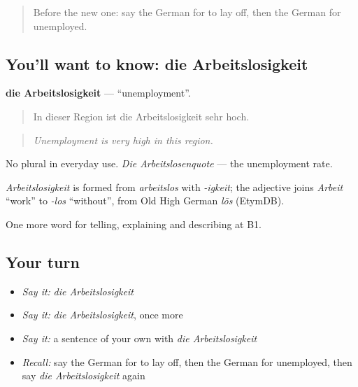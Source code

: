 \label{lesson:GE-C352-arbeitslosigkeit}



\begin{quote}
Before the new one: say the German for to lay off, then the German for unemployed.
\end{quote}

\subsection*{You'll want to know: die Arbeitslosigkeit}
\textbf{die Arbeitslosigkeit} — \textquotedblleft{}unemployment\textquotedblright{}.

\begin{quote}
In dieser Region ist die Arbeitslosigkeit sehr hoch.
\end{quote}

\begin{quote}
\emph{Unemployment is very high in this region.}
\end{quote}

No plural in everyday use. \emph{Die Arbeitslosenquote} — the unemployment rate.

\begin{cousinweb}
\emph{Arbeitslosigkeit} is formed from \emph{arbeitslos} with \emph{-igkeit}; the adjective joins \emph{Arbeit} \textquotedblleft{}work\textquotedblright{} to \emph{-los} \textquotedblleft{}without\textquotedblright{}, from Old High German \emph{lōs} (EtymDB).
\end{cousinweb}

\begin{grammarlens}[title={What you've built}]
One more word for telling, explaining and describing at B1.
\end{grammarlens}

\subsection*{Your turn}
\begin{itemize}
\raggedright
  \item \emph{Say it:} \emph{die Arbeitslosigkeit}
  \item \emph{Say it:} \emph{die Arbeitslosigkeit}, once more
  \item \emph{Say it:} a sentence of your own with \emph{die Arbeitslosigkeit}
  \item \emph{Recall:} say the German for to lay off, then the German for unemployed, then say \emph{die Arbeitslosigkeit} again
\end{itemize}

